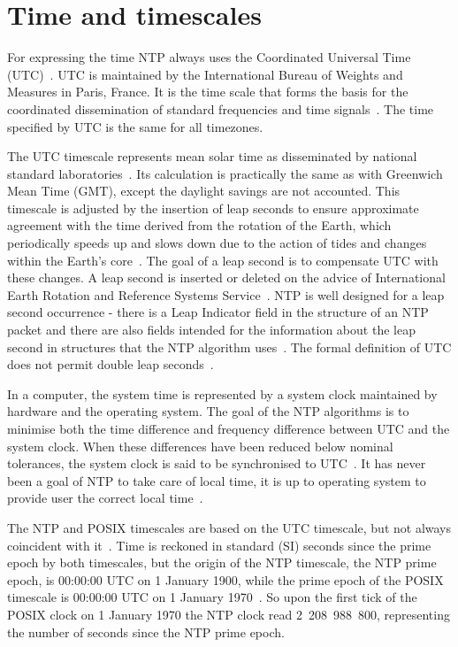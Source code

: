 
\section{Time and timescales}\label{sec:ntp-time}
For expressing the time NTP always uses the Coordinated Universal Time (UTC)~\cite{rfc5905}.
UTC is maintained by the International Bureau of Weights and Measures in Paris, France.
It is the time scale that forms the basis for the coordinated dissemination
of standard frequencies and time signals~\cite{bipm-utc}.
The time specified by UTC is the same for all timezones.

The UTC timescale represents mean solar time as disseminated by national
standard laboratories~\cite{rfc5905}.
Its calculation is practically the same as with Greenwich Mean Time (GMT),
except the daylight savings are not accounted.
This timescale is adjusted by the insertion of leap seconds to ensure approximate
agreement with the time derived from the rotation of the Earth,
which periodically speeds up and slows down due to the action
of tides and changes within the Earth's core~\cite{bipm-utc}.
The goal of a leap second is to compensate UTC with these changes.
A leap second is inserted or deleted on the advice of
International Earth Rotation and Reference Systems Service~\cite{bipm-utc}.
NTP is well designed for a leap second occurrence -
there is a Leap Indicator field
in the structure of an NTP packet and there are also fields intended for
the information about the leap second in structures that the NTP algorithm uses~\cite{rfc5905}.
The formal definition of UTC does not permit double leap seconds~\cite{posix}.

In a computer, the system time is represented by a system clock maintained by
hardware and the operating system.
The goal of the NTP algorithms is to minimise
both the time difference and frequency difference between UTC and the system clock.
When these differences have been reduced below nominal
tolerances, the system clock is said to be synchronised to UTC~\cite{rfc5905}.
It has never been a goal of NTP to take care of local time,
it is up to operating system to provide user the correct local time~\cite{ntp-overview}.

The NTP and POSIX timescales are based on the UTC timescale,
but not always coincident with it~\cite{ntp-leap}.
Time is reckoned in standard (SI) seconds since the prime epoch by both timescales,
but the origin of the NTP timescale, the NTP prime epoch, is 00:00:00 UTC on 1 January 1900,
while the prime epoch of the POSIX timescale is 00:00:00 UTC on 1 January 1970~\cite{ntp-leap}.
So upon the first tick of the POSIX clock on 1 January 1970 the NTP clock read 2~208~988~800,
representing the number of seconds since the NTP prime epoch.

